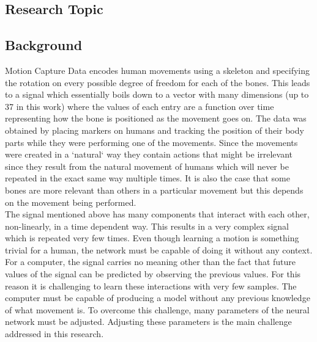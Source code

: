 \documentclass[letterpaper,9pt]{article}
\begin{document}

\subsection{Research Topic}

\subsection{Background}

Motion Capture Data encodes human movements using a skeleton and specifying the rotation on every possible degree of freedom for each of the bones. This leads to a signal which essentially boils down to a vector with many dimensions (up to 37 in this work) where the values of each entry are a function over time representing how the bone is positioned as the movement goes on. The data was obtained by placing markers on humans and tracking the position of their body parts while they were performing one of the movements. Since the movements were created in a `natural` way they contain actions that might be irrelevant since they result from the natural movement of humans which will never be repeated in the exact same way multiple times. It is also the case that some bones are more relevant than others in a particular movement but this depends on the movement being performed.\\

The signal mentioned above has many components that interact with each other, non-linearly, in a time dependent way. This results in a very complex signal which is repeated very few times. Even though learning a motion is something trivial for a human, the network must be capable of doing it without any context. For a computer, the signal carries no meaning other than the fact that future values of the signal can be predicted by observing the previous values. For this reason it is challenging to learn these interactions with very few samples. The computer must be capable of producing a model without any previous knowledge of what movement is. To overcome this challenge, many parameters of the neural network must be adjusted. Adjusting these parameters is the main challenge addressed in this research.\\
\end{document}
